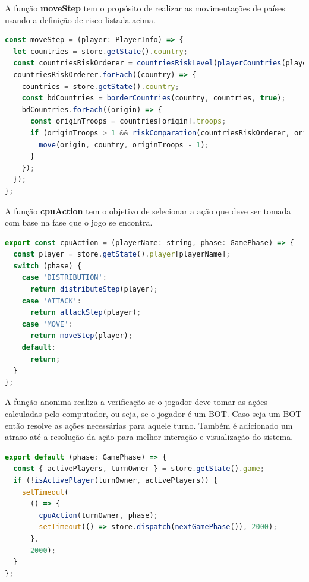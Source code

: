 \documentclass[rel_mlp]{iiufrgs}
\begin{document}
A função \textbf{moveStep} tem o propósito de realizar as movimentações de países usando a definição de risco listada acima.
\begin{lstlisting}[language=JavaScript]
const moveStep = (player: PlayerInfo) => {
  let countries = store.getState().country;
  const countriesRiskOrderer = countriesRiskLevel(playerCountries(player.name, countries));
  countriesRiskOrderer.forEach((country) => {
    countries = store.getState().country;
    const bdCountries = borderCountries(country, countries, true);
    bdCountries.forEach((origin) => {
      const originTroops = countries[origin].troops;
      if (originTroops > 1 && riskComparation(countriesRiskOrderer, origin, country)) {
        move(origin, country, originTroops - 1);
      }
    });
  });
};
\end{lstlisting}

A função \textbf{cpuAction} tem o objetivo de selecionar a ação que deve ser tomada com base na fase que o jogo se encontra.
\begin{lstlisting}[language=JavaScript]
export const cpuAction = (playerName: string, phase: GamePhase) => {
  const player = store.getState().player[playerName];
  switch (phase) {
    case 'DISTRIBUTION':
      return distributeStep(player);
    case 'ATTACK':
      return attackStep(player);
    case 'MOVE':
      return moveStep(player);
    default:
      return;
  }
};
\end{lstlisting}

A função anonima realiza a verificação se o jogador deve tomar as ações calculadas pelo computador, ou seja, se o jogador é um BOT. 
Caso seja um BOT então resolve as ações necessárias para aquele turno. 
Também é adicionado um atraso até a resolução da ação para melhor interação e visualização do sistema.
\begin{lstlisting}[language=JavaScript]
export default (phase: GamePhase) => {
  const { activePlayers, turnOwner } = store.getState().game;
  if (!isActivePlayer(turnOwner, activePlayers)) {
    setTimeout(
      () => {
        cpuAction(turnOwner, phase);
        setTimeout(() => store.dispatch(nextGamePhase()), 2000);
      },
      2000);
  }
};

\end{lstlisting}
\end{document}
